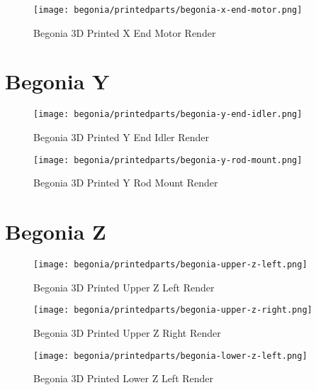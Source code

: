 \begin{figure}[H]
\centering
\texttt{[image: begonia/printedparts/begonia-x-end-motor.png]}
\caption{Begonia 3D Printed X End Motor Render}
\label{fig:begxendmotor}
\end{figure}


\section{Begonia Y}

\begin{figure}[H]
\centering
\texttt{[image: begonia/printedparts/begonia-y-end-idler.png]}
\caption{Begonia 3D Printed Y End Idler Render}
\label{fig:begyendidler}
\end{figure}

\begin{figure}[H]
\centering
\texttt{[image: begonia/printedparts/begonia-y-rod-mount.png]}
\caption{Begonia 3D Printed Y Rod Mount Render}
\label{fig:begyrodmount}
\end{figure}


\section{Begonia Z}

\begin{figure}[H]
\centering
\texttt{[image: begonia/printedparts/begonia-upper-z-left.png]}
\caption{Begonia 3D Printed Upper Z Left Render}
\label{fig:begupperzleft}
\end{figure}

\begin{figure}[H]
\centering
\texttt{[image: begonia/printedparts/begonia-upper-z-right.png]}
\caption{Begonia 3D Printed Upper Z Right Render}
\label{fig:begupperzright}
\end{figure}

\begin{figure}[H]
\centering
\texttt{[image: begonia/printedparts/begonia-lower-z-left.png]}
\caption{Begonia 3D Printed Lower Z Left Render}
\label{fig:beglowzleft}
\end{figure}

